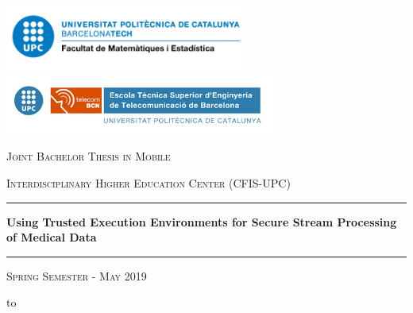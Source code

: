 \thispagestyle{empty}
\begin{center}

    \includegraphics[width=8cm]{img/logo-fme.png} 
    \hfill
    \includegraphics[width=9cm]{img/logo-upc.png}

    \vspace{0.5cm}

    \Large
    \textsc{Joint Bachelor Thesis in Mobile} 

    \textsc{Interdisciplinary Higher Education Center (CFIS-UPC)}

    \LARGE
    \rule{\textwidth}{0.4pt}
    \textbf{Using Trusted Execution Environments for Secure Stream Processing of Medical Data}
    \rule[0.5cm]{\textwidth}{0.4pt}

    \vspace{-0.2cm}
    \Large
    \textsc{Spring Semester - May 2019}
    \vspace{0.7cm}

    \normalsize
    \leavevmode\hbox to 


\end{center}
